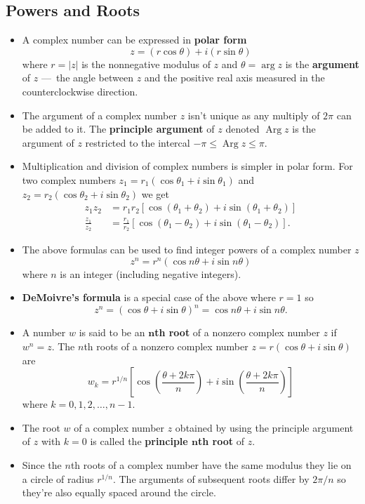 \documentclass{article}
\newcommand{\Arg}{\operatorname{Arg}}
\begin{document}
\subsection{Powers and Roots}

\begin{itemize}
  \item A complex number can be expressed in \textbf{polar form} \[z = (r \cos \theta) + i (r \sin \theta)\] where $r = |z|$ is the nonnegative modulus of $z$ and $\theta = \arg z$ is the \textbf{argument} of $z$ — the angle between $z$ and the positive real axis measured in the counterclockwise direction.

  \item The argument of a complex number $z$ isn't unique as any multiply of $2 \pi$ can be added to it. The \textbf{principle argument} of $z$ denoted $\Arg z$ is the argument of $z$ restricted to the intercal $-\pi \le \Arg z \le \pi$.

  \item Multiplication and division of complex numbers is simpler in polar form. For two complex numbers $z_1 = r_1 (\cos \theta_1 + i \sin \theta_1)$ and $z_2 = r_2 (\cos \theta_2 + i \sin \theta_2)$ we get \begin{align*}
          z_1 z_2         & = r_1 r_2 [\cos (\theta_1 + \theta_2) + i \sin (\theta_1 + \theta_2)]          \\
          \frac{z_1}{z_2} & = \frac{r_1}{r_2} [\cos (\theta_1 - \theta_2) + i \sin (\theta_1 - \theta_2)].
        \end{align*}

  \item The above formulas can be used to find integer powers of a complex number $z$ \[z^n = r^n (\cos n \theta + i \sin n \theta)\] where $n$ is an integer (including negative integers).

  \item \textbf{DeMoivre's formula} is a special case of the above where $r = 1$ so \[z^n = (\cos \theta + i \sin \theta)^n = \cos n \theta + i \sin n \theta.\]

  \item A number $w$ is said to be an \textbf{$\boldsymbol{n}$th root} of a nonzero complex number $z$ if $w^n = z$. The $n$th roots of a nonzero complex number $z = r (\cos \theta + i \sin \theta)$ are \[w_k = r^{1 / n} \left[ \cos \left( \frac{\theta + 2 k \pi}{n} \right) + i \sin \left( \frac{\theta + 2 k \pi}{n} \right) \right]\] where $k = 0, 1, 2, \ldots, n - 1$.

  \item The root $w$ of a complex number $z$ obtained by using the principle argument of $z$ with $k = 0$ is called the \textbf{principle $\boldsymbol{n}$th root} of $z$.

  \item Since the $n$th roots of a complex number have the same modulus they lie on a circle of radius $r^{1 / n}$. The arguments of subsequent roots differ by $2 \pi / n$ so they're also equally spaced around the circle.
\end{itemize}
\end{document}
